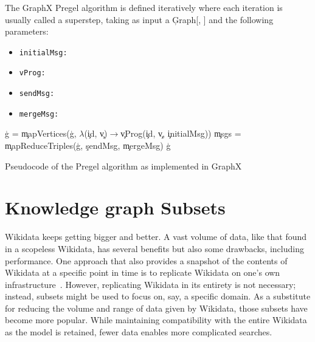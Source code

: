The GraphX Pregel algorithm is defined iteratively where each iteration is
usually called a superstep, taking as input a \c{Graph}[\VertSet, \EdgeSet] and the following parameters:

\begin{itemize}
    \item \texttt{initialMsg:}
    \item \texttt{vProg:}
    \item \texttt{sendMsg:}
    \item \texttt{mergeMsg:}
\end{itemize}

\begin{algorithm}[!hbt]
    \DontPrintSemicolon
    \SetAlgoVlined
    \blockskip
    \c{g} = \c{mapVertices}(\c{g}, $\lambda$(\c{id}, \c{v})$\rightarrow$\c{vProg}(\c{id}, \c{v}, \c{initialMsg}))  \;
    \c{msgs} = \c{mapReduceTriples}(\c{g}, \c{sendMsg}, \c{mergeMsg}) \;
    \Return\c{g}
    \caption{Pseudocode of the Pregel algorithm as implemented in GraphX~\cite{https://doi.org/10.48550/arxiv.2110.11709}}
\end{algorithm}

\section{Knowledge graph Subsets}

Wikidata keeps getting bigger and better. A vast volume of data, like that found in a scopeless Wikidata, has several benefits but also some drawbacks, including performance. One approach that also provides a snapshot of the contents of Wikidata at a specific point in time is to replicate Wikidata on one's own infrastructure~\cite{10.37044/osf.io/wu9et}. However, replicating Wikidata in its entirety is not necessary; instead, subsets might be used to focus on, say, a specific domain. As a substitute for reducing the volume and range of data given by Wikidata, those subsets have become more popular. While maintaining compatibility with the entire Wikidata as the model is retained, fewer data enables more complicated searches.

